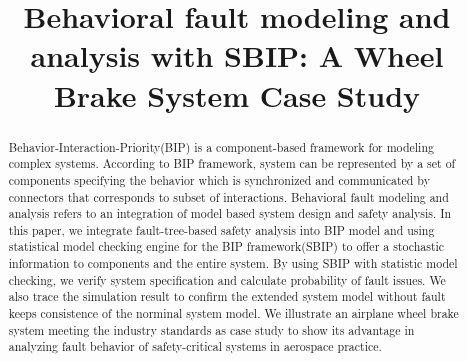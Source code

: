 \documentclass[conference]{IEEEtran}
\begin{document}
\title{Behavioral fault modeling and analysis with SBIP:
	A Wheel Brake System Case Study\\}

\author{
\and
{}
\and
{}
}

\maketitle

\begin{abstract}
Behavior-Interaction-Priority(BIP) is a component-based framework for modeling complex systems. According to BIP framework, system can be represented by a set of components specifying the behavior which is synchronized and communicated by connectors that corresponds to subset of interactions.
Behavioral fault modeling and analysis refers to an integration of model based system design and safety analysis. In this paper, we integrate fault-tree-based safety analysis into BIP model and using statistical model checking engine for the BIP framework(SBIP) to offer a stochastic information to components and the entire system. By using SBIP with statistic model checking, we verify system specification and calculate probability of fault issues. We also trace the simulation result to confirm the extended system model without fault keeps consistence of the norminal system model.  
We illustrate an airplane wheel brake system meeting the industry standards as case study to show its advantage in analyzing fault behavior of safety-critical systems in aerospace practice.
\end{abstract}
\end{document}
